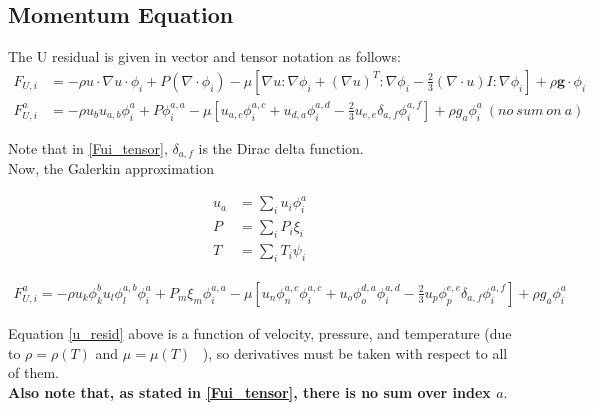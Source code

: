 \subsection{Momentum Equation}
The U residual is given in vector and tensor notation as follows:
\begin{align}
    F_{U,i} &= -\rho u \cdot \nabla u \cdot \phi_i + P(\nabla \cdot \phi_i) - \mu \left [\nabla u : \nabla \phi_i + (\nabla u)^T : \nabla \phi_i - \frac{2}{3} (\nabla \cdot u) I : \nabla \phi_i \right ] + \rho \mathbf{g} \cdot \phi_i \\
    F_{U,i}^a &= -\rho u_b u_{a,b} \phi_i^a + P\phi_i^{a,a} - \mu \left [u_{a,c} \phi_i^{a,c} + u_{d,a} \phi_i^{a,d} - \frac{2}{3} u_{e,e} \delta_{a,f} \phi_i^{a,f} \right ] + \rho g_a \phi_i^a \ (no \ sum \ on \ a) \label{Fui_tensor}
\end{align}

Note that in \ref{Fui_tensor}, $\delta_{a,f}$ is the Dirac delta function. \\

Now, the Galerkin approximation

\begin{align*}
    u_a &= \sum_i u_i \phi_i^a\\
    P &= \sum_i P_i \xi_i\\
    T &= \sum_i T_i \psi_i
\end{align*}

\begin{align}
    F_{U,i}^a =  -\rho u_k \phi_k^b u_l \phi_l^{a,b} \phi_i^a + P_m \xi_m \phi_i^{a,a} - \mu \left [u_n \phi_n^{a,c} \phi_i^{a,c} + u_o \phi_o^{d,a} \phi_i^{a,d} - \frac{2}{3} u_p \phi_p^{e,e} \delta_{a,f} \phi_i^{a,f} \right ] + \rho g_a \phi_i^a \label{u_resid}
\end{align}

Equation \ref{u_resid} above is a function of velocity, pressure, and temperature (due to $\rho = \rho(T)$ and $\mu = \mu(T)$ \ ), so derivatives must be taken with respect to all of them.\\
\textbf{Also note that, as stated in \ref{Fui_tensor}, there is no sum over index $a$}.

